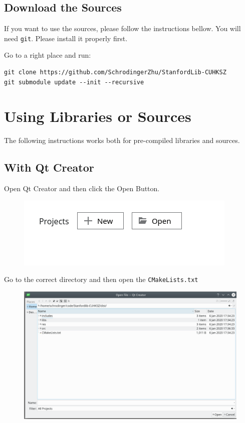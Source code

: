 \documentclass[a4paper,12pt]{report}
\begin{document}
\section{Download the Sources}
If you want to use the sources, please follow the instructions bellow. You will need \texttt{git}. Please install it properly first.

Go to a right place and run:
\begin{verbatim}
git clone https://github.com/SchrodingerZhu/StanfordLib-CUHKSZ
git submodule update --init --recursive
\end{verbatim}
\chapter{Using Libraries or Sources}
The following instructions works both for pre-compiled libraries and sources.

\section{With Qt Creator}
Open Qt Creator and then click the Open Button.

\begin{figure}[H] 
	\centering
	\includegraphics{qt_creator1}
\end{figure}

Go to the correct directory and then open the \texttt{CMakeLists.txt}

\begin{figure}[H] 
	\centering
	\includegraphics[width=\linewidth]{qt_creator2}
\end{figure}
\end{document}
